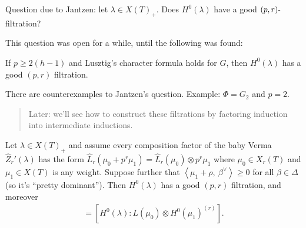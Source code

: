\begin{remark}

Question due to Jantzen: let \(\lambda \in X(T)_+\). Does
\(H^0(\lambda)\) have a good \((p, r){\hbox{-}}\)filtration?

\end{remark}

This question was open for a while, until the following was found:

\begin{proposition}

If \(p\geq 2(h-1)\) and Lusztig's character formula holds for \(G\),
then \(H^0(\lambda)\) has a good \((p, r)\) filtration.

\end{proposition}

\begin{proposition}

There are counterexamples to Jantzen's question. Example: \(\Phi = G_2\)
and \(p=2\).

\end{proposition}

\begin{quote}
Later: we'll see how to construct these filtrations by factoring
induction into intermediate inductions.
\end{quote}

\begin{theorem}[?]

Let \(\lambda \in X(T)_+\) and assume every composition factor of the
baby Verma \(\widehat{Z}_r'(\lambda)\) has the form
\(\widehat{L}_r(\mu_0 + p^r \mu_1) = \widehat{L}_r(\mu_0) \otimes p^r \mu_1\)
where \(\mu_0\in X_r(T)\) and \(\mu_1\in X(T)\) is any weight. Suppose
further that
\({\left\langle {\mu_1 + \rho},~{\beta^\vee} \right\rangle}\geq 0\) for
all \(\beta\in \Delta\) (so it's ``pretty dominant''). Then
\(H^0(\lambda)\) has a good \((p, r)\) filtration, and moreover
\begin{align*}  
[ \widehat{Z}_r'(\lambda) : \widehat{L}_r(\mu_0) \otimes p^r \mu_1 ]
= [ H^0(\lambda) : L(\mu_0) \otimes H^0(\mu_1)^{(r)} ]
.\end{align*}

\end{theorem}

